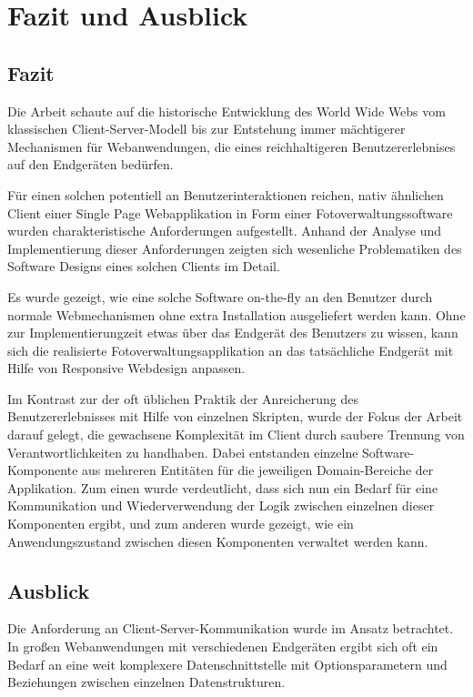 \chapter{Fazit und Ausblick}

\section{Fazit}

Die Arbeit schaute auf die historische Entwicklung des World Wide Webs vom klassischen Client-Server-Modell bis zur Entstehung immer mächtigerer Mechanismen für Webanwendungen, die eines reichhaltigeren Benutzererlebnises auf den Endgeräten bedürfen.

Für einen solchen potentiell an Benutzerinteraktionen reichen, nativ ähnlichen Client einer Single Page Webapplikation in Form einer Fotoverwaltungssoftware wurden charakteristische Anforderungen aufgestellt. Anhand der Analyse und Implementierung dieser Anforderungen zeigten sich wesenliche Pro­b­le­ma­tiken des Software Designs eines solchen Clients im Detail.

Es wurde gezeigt, wie eine solche Software on-the-fly an den Benutzer durch normale Webmechanismen ohne extra Installation ausgeliefert werden kann.
Ohne zur Implementierungzeit etwas über das Endgerät des Benutzers zu wissen, kann sich die realisierte Fotoverwaltungsapplikation an das tatsächliche Endgerät mit Hilfe von Responsive Webdesign anpassen.

Im Kontrast zur der oft üblichen Praktik der Anreicherung des Benutzererlebnisses mit Hilfe von einzelnen Skripten, wurde der Fokus der Arbeit darauf gelegt, die gewachsene Komplexität im Client durch saubere Trennung von Verantwortlichkeiten zu handhaben. Dabei entstanden einzelne Software-Komponente aus mehreren Entitäten für die jeweiligen Domain-Bereiche der Applikation. Zum einen wurde verdeutlicht, dass sich nun ein Bedarf für eine Kommunikation und Wiederverwendung der Logik zwischen einzelnen dieser Komponenten ergibt, und zum anderen wurde gezeigt, wie ein Anwendungszustand zwischen diesen Komponenten verwaltet werden kann.

\section{Ausblick}

Die Anforderung an Client-Server-Kommunikation wurde im Ansatz betrachtet. In großen Webanwendungen mit verschiedenen Endgeräten ergibt sich oft ein Bedarf an eine weit komplexere Datenschnittstelle mit Optionsparametern und Beziehungen zwischen einzelnen Datenstrukturen.

